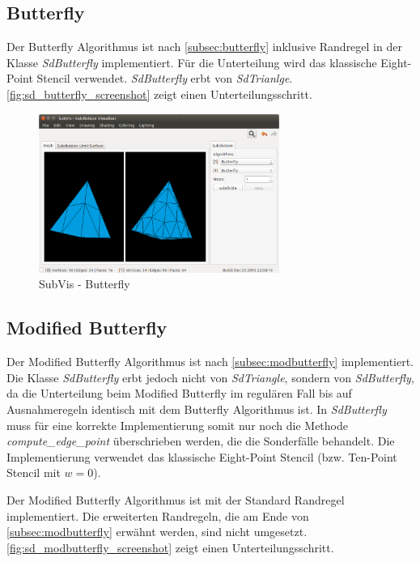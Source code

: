 \subsection{Butterfly}

Der Butterfly Algorithmus ist nach \autoref{subsec:butterfly}
inklusive Randregel in der Klasse \emph{SdButterfly} implementiert.
Für die Unterteilung wird das klassische Eight-Point Stencil verwendet.
\emph{SdButterfly} erbt von \emph{SdTrianlge}.
\autoref{fig:sd_butterfly_screenshot} zeigt einen Unterteilungsschritt.

\begin{figure}
  \centering
  \includegraphics[width=0.7\textwidth]{content/media/sd_butterfly_screenshot.png}
  \caption{SubVis - Butterfly}
  \label{fig:sd_butterfly_screenshot}
\end{figure}

\subsection{Modified Butterfly}

Der Modified Butterfly Algorithmus ist nach \autoref{subsec:modbutterfly} implementiert.
Die Klasse \emph{SdButterfly} erbt jedoch nicht von \emph{SdTriangle},
sondern von \emph{SdButterfly}, da die Unterteilung
beim Modified Butterfly im regulären Fall bis auf Ausnahmeregeln
identisch mit dem Butterfly Algorithmus ist. In \emph{SdButterfly}
muss für eine korrekte Implementierung somit nur noch die Methode
\emph{compute\_edge\_point} überschrieben werden, die
die Sonderfälle behandelt.
Die Implementierung verwendet das klassische Eight-Point Stencil
(bzw. Ten-Point Stencil mit \(w = 0\)).

Der Modified Butterfly Algorithmus ist mit der Standard Randregel
implementiert.
Die erweiterten Randregeln, die am Ende von \autoref{subsec:modbutterfly}
erwähnt werden, sind nicht umgesetzt.
\autoref{fig:sd_modbutterfly_screenshot} zeigt einen Unterteilungsschritt.

